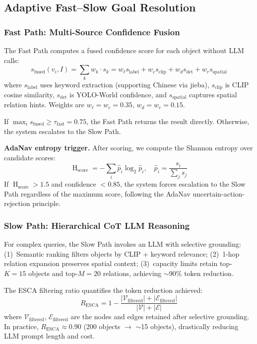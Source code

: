 \documentclass[conference]{IEEEtran}
\DeclareMathOperator{\Entropy}{H}
\begin{document}
\subsection{Adaptive Fast--Slow Goal Resolution}
\label{sec:fastslow}

\subsubsection{Fast Path: Multi-Source Confidence Fusion}

The Fast Path computes a fused confidence score for each object without LLM calls:
\begin{equation}
s_{\text{fused}}(v_i, I) = \sum_{k} w_k \cdot s_k = w_\ell s_{\text{label}} + w_c s_{\text{clip}} + w_d s_{\text{det}} + w_r s_{\text{spatial}}
\label{eq:fusion}
\end{equation}
where $s_{\text{label}}$ uses keyword extraction (supporting Chinese via jieba), $s_{\text{clip}}$ is CLIP cosine similarity, $s_{\text{det}}$ is YOLO-World confidence, and $s_{\text{spatial}}$ captures spatial relation hints.
Weights are $w_\ell = w_c = 0.35$, $w_d = w_r = 0.15$.

If $\max_i s_{\text{fused}} \geq \tau_{\text{fast}} = 0.75$, the Fast Path returns the result directly.
Otherwise, the system escalates to the Slow Path.

\textbf{AdaNav entropy trigger.}
After scoring, we compute the Shannon entropy over candidate scores:
\begin{equation}
\Entropy_{\text{score}} = -\sum_i \hat{p}_i \log_2 \hat{p}_i, \quad \hat{p}_i = \frac{s_i}{\sum_j s_j}
\label{eq:adanav}
\end{equation}
If $\Entropy_{\text{score}} > 1.5$ and confidence $< 0.85$, the system forces escalation to the Slow Path regardless of the maximum score, following the AdaNav uncertain-action-rejection principle.

\subsubsection{Slow Path: Hierarchical CoT LLM Reasoning}

For complex queries, the Slow Path invokes an LLM with selective grounding:
(1)~Semantic ranking filters objects by CLIP + keyword relevance;
(2)~1-hop relation expansion preserves spatial context;
(3)~capacity limits retain top-$K{=}15$ objects and top-$M{=}20$ relations, achieving $\sim$90\% token reduction.

The ESCA filtering ratio quantifies the token reduction achieved:
\begin{equation}
R_{\text{ESCA}} = 1 - \frac{|\mathcal{V}_{\text{filtered}}| + |\mathcal{E}_{\text{filtered}}|}{|\mathcal{V}| + |\mathcal{E}|}
\label{eq:esca}
\end{equation}
where $\mathcal{V}_{\text{filtered}}$, $\mathcal{E}_{\text{filtered}}$ are the nodes and edges retained after selective grounding.
In practice, $R_{\text{ESCA}} \approx 0.90$ (200 objects $\to$ $\sim$15 objects), drastically reducing LLM prompt length and cost.
\end{document}
